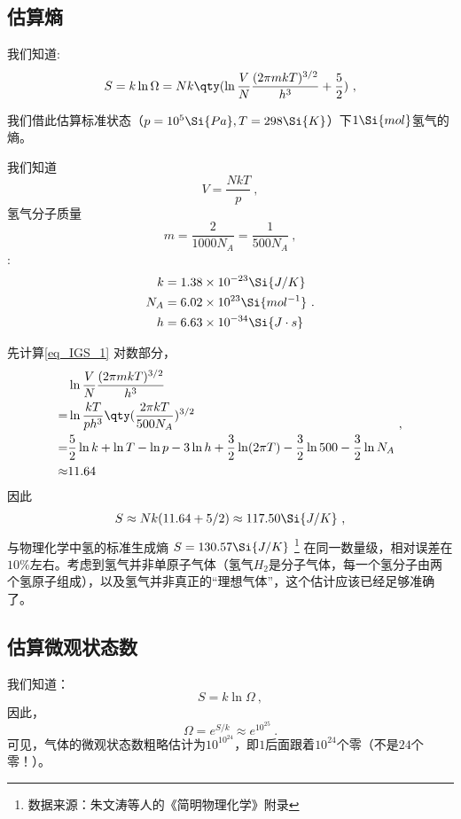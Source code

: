 

\subsection{估算熵}
我们知道:
\begin{equation}\label{eq_IGS_1}
S = k\ln \Omega  = Nk \qty(\ln \frac{V}{N} \frac{(2\pi mkT)^{3/2}}{h^3} + \frac52)~,
\end{equation}

我们借此估算标准状态（$p=10^5 \Si{Pa}, T=298\Si{K}$）下$1 \Si{mol}$氢气的熵。

我们知道 
$$V=\frac{NkT}{p}~,$$
氢气分子质量 
$$m = \frac{2}{1000 N_A} = \frac{1}{500 N_A}~,$$
 : 
$$
\begin{aligned}
k &= 1.38 \times 10^{-23}\Si{J/K}\\
N_A &= 6.02 \times 10^{23} \Si{mol^{-1}}\\
h &= 6.63\times10^{-34} \Si{J\cdot s}
\end{aligned}
~.$$

先计算\autoref{eq_IGS_1} 对数部分，
$$
\begin{aligned}
 & \ln \frac{V}{N} \frac{(2\pi mkT)^{3/2}}{h^3} \\
 = & \ln \frac{kT}{p h^3} \qty(\frac{2\pi kT}{500 N_A})^{3/2}\\
 = & \frac{5}{2} \ln k + \ln T - \ln p - 3 \ln h + \frac{3}{2} \ln (2 \pi T) - \frac{3}{2} \ln 500 - \frac{3}{2} \ln N_A \\
 \approx & 11.64\\
\end{aligned}~,
$$
因此
$$
\begin{aligned}
S \approx Nk (11.64+5/2) \approx 117.50 \Si{J/K}
\end{aligned}~,
$$
与物理化学中氢的标准生成熵 $S = 130.57 \Si{J/K}$ \footnote{数据来源：朱文涛等人的《简明物理化学》附录} 在同一数量级，相对误差在$10\%$左右。考虑到氢气并非单原子气体（氢气$H_2$是分子气体，每一个氢分子由两个氢原子组成），以及氢气并非真正的“理想气体”，这个估计应该已经足够准确了。

\subsection{估算微观状态数}
我们知道：
\begin{equation}
S = k \ln \Omega~,
\end{equation}
因此，
$$
\Omega = e^{S/k}~ \approx e^{10^{25}} ~.
$$
可见，气体的微观状态数粗略估计为$10^{10^{24}}$，即$1$后面跟着$10^{24}$个零（不是$24$个零！）。

